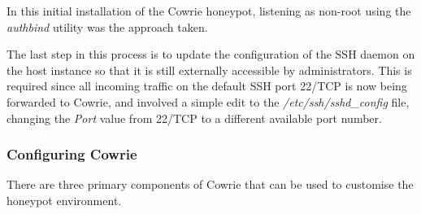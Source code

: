 In this initial installation of the Cowrie honeypot, listening as non-root using the \textit{authbind} utility was the approach taken.

The last step in this process is to update the configuration of the SSH daemon on the host instance so that it is still externally accessible by administrators. This is required since all incoming traffic on the default SSH port 22/TCP is now being forwarded to Cowrie, and involved a simple edit to the \textit{/etc/ssh/sshd\_config} file, changing the \textit{Port} value from 22/TCP to a different available port number. 



\subsubsection{Configuring Cowrie}
There are three primary components of Cowrie that can be used to customise the honeypot environment.
